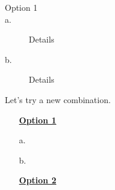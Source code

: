 \documentclass[10pt,a4paper]{article}
\begin{document}
	\begin{description}
		\item[Option 1]
		\item[a.] Details
		\item[b.] Details
	\end{description}
	
	Let's try a new combination.
	
	\begin{enumerate}
		\item[\underline{\textbf{Option 1}}]
		\item[a.]
		\item[b.]
		\item[\underline{\textbf{Option 2}}]
	\end{enumerate}
	
\end{document}
